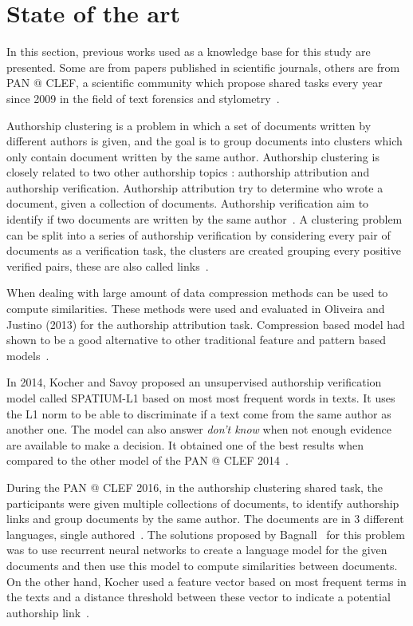\section{State of the art \label{sec:state_of_the_art}}

In this section, previous works used as a knowledge base for this study are presented.
Some are from papers published in scientific journals, others are from PAN @ CLEF, a scientific community which propose shared tasks every year since 2009 in the field of text forensics and stylometry~\cite{pan_webis}.

Authorship clustering is a problem in which a set of documents written by different authors is given, and the goal is to group documents into clusters which only contain document written by the same author.
Authorship clustering is closely related to two other authorship topics : authorship attribution and authorship verification.
Authorship attribution try to determine who wrote a document, given a collection of documents.
Authorship verification aim to identify if two documents are written by the same author~\cite{pan11_verif}.
A clustering problem can be split into a series of authorship verification by considering every pair of documents as a verification task, the clusters are created grouping every positive verified pairs, these are also called links~\cite{pan16_clustering_site}.

When dealing with large amount of data compression methods can be used to compute similarities.
These methods were used and evaluated in Oliveira and Justino (2013) for the authorship attribution task.
Compression based model had shown to be a good alternative to other traditional feature and pattern based models~\cite{comparing_compression}.

In 2014, Kocher and Savoy proposed an unsupervised authorship verification model called \textsc{SPATIUM-L1} based on most most frequent words in texts.
It uses the L1 norm to be able to discriminate if a text come from the same author as another one.
The model can also answer \textit{don't know} when not enough evidence are available to make a decision.
It obtained one of the best results when compared to the other model of the PAN @ CLEF 2014~\cite{kocher_linking}.

During the PAN @ CLEF 2016, in the authorship clustering shared task, the participants were given multiple collections of documents, to identify authorship links and group documents by the same author.
The documents are in 3 different languages, single authored~\cite{pan16}.
The solutions proposed by Bagnall~\cite{bagnall_pan16} for this problem was to use recurrent neural networks to create a language model for the given documents and then use this model to compute similarities between documents.
On the other hand, Kocher used a feature vector based on most frequent terms in the texts and a distance threshold between these vector to indicate a potential authorship link~\cite{kocher_pan16}.

